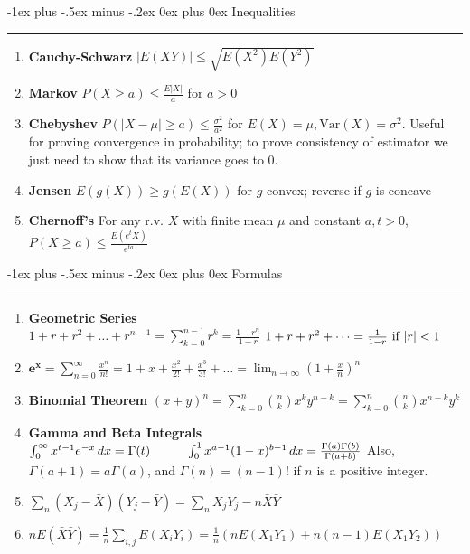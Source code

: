 \documentclass[10pt,landscape]{article}
\makeatletter
\newcommand{\var}{\textrm{Var}}
\renewcommand{\section}{\@startsection{section}{1}{0mm}%
                                {-1ex plus -.5ex minus -.2ex}%
                                {0ex plus 0ex}%
                                {\normalfont\medium\bfseries}}
\makeatother
\begin{document}
\begin{multicols*}{3}
\section{Inequalities} \hrule height 1pt \smallskip

\begin{enumerate}
\itemsep0em
\item \textbf{Cauchy-Schwarz} $|E(XY)| \leq \sqrt{E(X^2)E(Y^2)}$
\item \textbf{Markov} $P(X \geq a) \leq \frac{E|X|}{a}$ for $a>0$
\item \textbf{Chebyshev} $P(|X - \mu| \geq a) \leq \frac{\sigma^2}{a^2}$ for $E(X)=\mu, \var(X) = \sigma^2$. Useful for proving convergence in probability; to prove consistency of estimator we just need to show that its variance goes to 0.
\item \textbf{Jensen} $E(g(X)) \geq g(E(X))$ for $g$ convex; reverse if $g$ is concave
\item \textbf{Chernoff's} For any r.v. $X$ with finite mean $\mu$ and constant $a,t > 0$, $P(X \geq a) \leq \frac{E(e^tX)}{e^{ta}}$
\end{enumerate}


\section{Formulas} \hrule height 1pt \smallskip
\begin{enumerate}
    \itemsep0em
    \item \textbf{Geometric Series } \\
    $1 + r + r^2 + \dots + r^{n-1} = \sum_{k=0}^{n-1} r^k = \frac{1 - r^n}{1 -r}$
    $1 + r + r^2 + \dots = \frac{1}{1-r} \textnormal{ if $|r|<1$}$
    \item $\mathbf{e^x} = \sum_{n=0}^\infty \frac{x^n}{n!}= 1 + x + \frac{x^2}{2!} + \frac{x^3}{3!} + \dots = \lim_{n \rightarrow \infty} \left( 1 + \frac{x}{n} \right)^n$
    \item \textbf{Binomial Theorem} $(x+y)^n=\sum_{k=0}^n {n\choose k} x^k y^{n-k}=\sum_{k=0}^n {n\choose k} x^{n-k} y^k$
    \item \textbf{Gamma and Beta Integrals}
    $ \int_0^\infty x^{t-1}e^{-x}\, dx = \Gamma(t) \hspace{1 cm} \int_0^1 x^{a - 1}(1-x)^{b-1}\, dx = \frac{\Gamma(a)\Gamma(b)}{\Gamma(a + b)}$
    Also, $\Gamma(a+1) = a \Gamma(a)$, and $\Gamma(n) = (n - 1)!$ if $n$ is a positive integer. 
    \item $\sum_n (X_j - \bar X)(Y_j - \bar Y) = \sum_n X_jY_j - n\bar X \bar Y$
    \item $nE(\bar X \bar Y) = \frac{1}{n}\sum_{i,j}E(X_iY_i) = \frac{1}{n}(nE(X_1Y_1) + n(n-1)E(X_1Y_2))$
\end{enumerate}


\end{multicols*}
\end{document}
